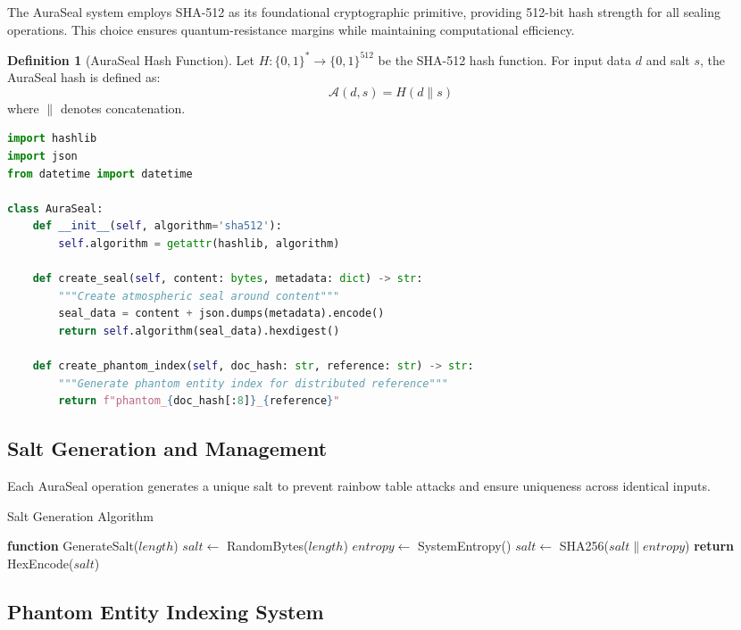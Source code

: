 \documentclass[12pt,a4paper]{report}
\theoremstyle{definition}
\newtheorem{definition}{Definition}[chapter]
\begin{document}
The AuraSeal system employs SHA-512 as its foundational cryptographic primitive, providing 512-bit hash strength for all sealing operations. This choice ensures quantum-resistance margins while maintaining computational efficiency.

\begin{definition}[AuraSeal Hash Function]
Let $H: \{0,1\}^* \rightarrow \{0,1\}^{512}$ be the SHA-512 hash function. For input data $d$ and salt $s$, the AuraSeal hash is defined as:
$$\mathcal{A}(d,s) = H(d \| s)$$
where $\|$ denotes concatenation.
\end{definition}

\begin{lstlisting}[language=Python, caption=SHA-512 Implementation]
import hashlib
import json
from datetime import datetime

class AuraSeal:
    def __init__(self, algorithm='sha512'):
        self.algorithm = getattr(hashlib, algorithm)
        
    def create_seal(self, content: bytes, metadata: dict) -> str:
        """Create atmospheric seal around content"""
        seal_data = content + json.dumps(metadata).encode()
        return self.algorithm(seal_data).hexdigest()
    
    def create_phantom_index(self, doc_hash: str, reference: str) -> str:
        """Generate phantom entity index for distributed reference"""
        return f"phantom_{doc_hash[:8]}_{reference}"
\end{lstlisting}

\subsection{Salt Generation and Management}

Each AuraSeal operation generates a unique salt to prevent rainbow table attacks and ensure uniqueness across identical inputs.

\begin{algorithm}
\caption{Salt Generation Algorithm}
\begin{algorithmic}[1]
\STATE \textbf{function} GenerateSalt($length$)
\STATE $salt \leftarrow$ RandomBytes($length$)
\STATE $entropy \leftarrow$ SystemEntropy()
\STATE $salt \leftarrow$ SHA256($salt \| entropy$)
\STATE \textbf{return} HexEncode($salt$)
\end{algorithmic}
\end{algorithm}

\subsection{Phantom Entity Indexing System}
\end{document}
